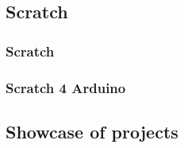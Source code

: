 \documentclass{beamer}
\begin{document}
\subsection{Scratch}
\begin{frame}
\frametitle{Scratch}

\end{frame}

\begin{frame}
\frametitle{Scratch 4 Arduino}

\end{frame}






\subsection{Showcase of projects}
\end{document}
